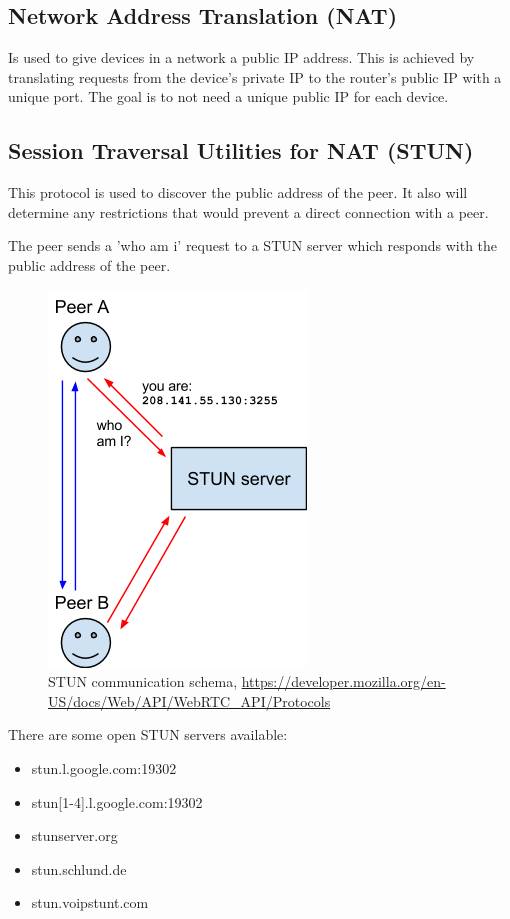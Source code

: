 \subsection{Network Address Translation (NAT)}
Is used to give devices in a network a public IP address. This is achieved by translating requests from the device's private IP to the router's public IP with a unique port. The goal is to not need a unique public IP for each device.

\subsection{Session Traversal Utilities for NAT (STUN)}
This protocol is used to discover the public address of the peer. It also will determine any restrictions that would prevent a direct connection with a peer.

The peer sends a 'who am i' request to a STUN server which responds with the public address of the peer.

\begin{figure}[H]
	\includegraphics[scale=0.5]{webrtc-stun.png}
	\centering
	\caption{STUN communication schema, \url{https://developer.mozilla.org/en-US/docs/Web/API/WebRTC_API/Protocols}}
	\label{fig:STUN}
\end{figure}

There are some open STUN servers available:
\begin{itemize}
	\item stun.l.google.com:19302
	\item stun[1-4].l.google.com:19302
	\item stunserver.org
	\item stun.schlund.de
	\item stun.voipstunt.com
\end{itemize}

